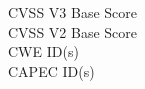 \section*{}
{\footnotesize
\begin{description}
    \item[CVSS V3 Base Score] 
    \item[CVSS V2 Base Score] 
    \item[CWE ID(s)] \texttt{}
    \item[CAPEC ID(s)] \texttt{}
\end{description}
}

